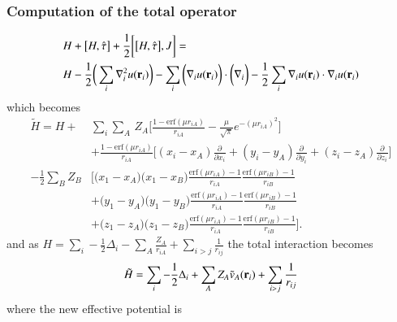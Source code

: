 \documentclass[aip,jcp,reprint,noshowkeys,superscriptaddress]{revtex4-1}
\newcommand{\deriv}[3]{\frac{\partial^{#3} #1}{\partial {#2}^{#3}}}
\newcommand{\br}[0]{{\bf {r}}}
\begin{document}
\subsubsection{Computation of the total operator}
\begin{equation}
 \begin{aligned}
& H + \big[ H,\hat{\tau} \big] + \frac{1}{2} \bigg[ \big[H,\hat{\tau}\big],J\bigg] = \\ & H -\frac{1}{2} \bigg( \sum_i \nabla^2_i u(\br{}_i) \bigg)    
                                                                   -\sum_i \bigg(\nabla_i u(\br{}_i) \bigg) \cdot \bigg( \nabla_i  \bigg)  
                                                                   -\frac{1}{2}\sum_i \nabla_i u({\bf r}_i) \cdot \nabla_i u({\bf r}_i) 
 \end{aligned}
\end{equation}
which becomes
\begin{equation}
 \begin{aligned}
  \tilde{H} = H +&  \sum_i \sum_{A}\, Z_A  \bigg[ \frac{1 - \text{erf}(\mu r_{iA})}{r_{iA}}  - \frac{\mu}{\sqrt{\pi}} e^{-(\mu r_{iA})^2}  \bigg] \\
           &+  \frac{1 - \text{erf}(\mu r_{iA})}{r_{iA}} \bigg[ (x_i - x_A) \deriv{}{x_i}{} + (y_i - y_A) \deriv{}{y_i}{} + (z_i - z_A) \deriv{}{z_i}{}\bigg] \\
           - \frac{1}{2}\sum_{B} Z_B &\bigg[ \big( x_1 - x_A \big) \big( x_1 - x_B \big)  \frac{\text{erf}(\mu r_{iA}) - 1}{r_{iA}} \frac{\text{erf}(\mu r_{iB}) - 1}{r_{iB}} \\
           &+  \big( y_1 - y_A \big) \big( y_1 - y_B \big)  \frac{\text{erf}(\mu r_{iA}) - 1}{r_{iA}} \frac{\text{erf}(\mu r_{iB}) - 1}{r_{iB}} \\ 
           &+  \big( z_1 - z_A \big) \big( z_1 - z_B \big)  \frac{\text{erf}(\mu r_{iA}) - 1}{r_{iA}} \frac{\text{erf}(\mu r_{iB}) - 1}{r_{iB} } \bigg].
 \end{aligned}
\end{equation}
and as $H = \sum_i -\frac{1}{2} \Delta_i - \sum_A \frac{Z_A}{r_{iA}} + \sum_{i>j} \frac{1}{r_{ij}} $ the total interaction becomes 
\begin{equation}
 \label{eq:final_one_e_h}
 \tilde{H} =  \sum_i -\frac{1}{2} \Delta_i + \sum_A Z_A \tilde{v}_A({\bf r}_i)  + \sum_{i>j} \frac{1}{r_{ij}}
\end{equation}
where the new effective potential is 
\end{document}
